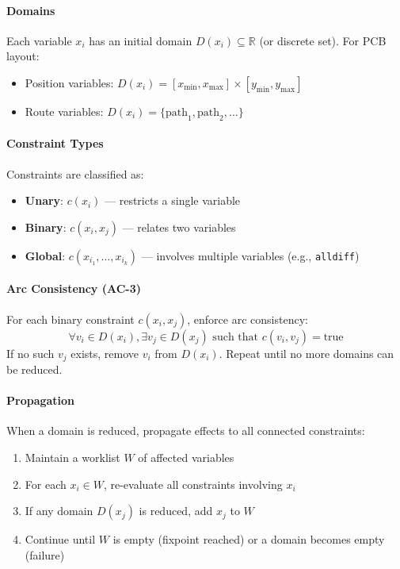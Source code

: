 \paragraph{Domains}
Each variable $x_i$ has an initial domain $D(x_i) \subseteq \mathbb{R}$ (or discrete set). For PCB layout:
\begin{itemize}
\item Position variables: $D(x_i) = [x_{\min}, x_{\max}] \times [y_{\min}, y_{\max}]$
\item Route variables: $D(x_i) = \{\text{path}_1, \text{path}_2, \ldots\}$
\end{itemize}

\paragraph{Constraint Types}
Constraints are classified as:
\begin{itemize}
\item \textbf{Unary}: $c(x_i)$ --- restricts a single variable
\item \textbf{Binary}: $c(x_i, x_j)$ --- relates two variables
\item \textbf{Global}: $c(x_{i_1}, \ldots, x_{i_k})$ --- involves multiple variables (e.g., \texttt{alldiff})
\end{itemize}

\paragraph{Arc Consistency (AC-3)}
For each binary constraint $c(x_i, x_j)$, enforce arc consistency:
\begin{equation}
\forall v_i \in D(x_i), \exists v_j \in D(x_j) \text{ such that } c(v_i, v_j) = \text{true}
\end{equation}
If no such $v_j$ exists, remove $v_i$ from $D(x_i)$. Repeat until no more domains can be reduced.

\paragraph{Propagation}
When a domain is reduced, propagate effects to all connected constraints:
\begin{enumerate}
\item Maintain a worklist $W$ of affected variables
\item For each $x_i \in W$, re-evaluate all constraints involving $x_i$
\item If any domain $D(x_j)$ is reduced, add $x_j$ to $W$
\item Continue until $W$ is empty (fixpoint reached) or a domain becomes empty (failure)
\end{enumerate}

